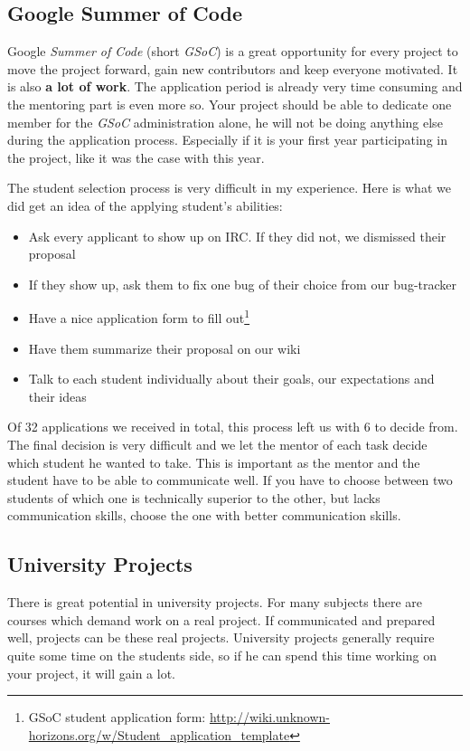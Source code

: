 \subsection{Google Summer of Code}
Google \textit{Summer of Code} (short \textit{GSoC}) is a great opportunity for every \OS{} project to move the project
forward, gain new contributors and keep everyone motivated. It is also \textbf{a lot of work}. The application period is
already very time consuming and the mentoring part is even more so. Your project should be able to dedicate one member
for the \textit{GSoC} administration alone, he will not be doing anything else during the application process. Especially
if it is your first year participating in the project, like it was the case with \UH{} this year.

The student selection process is very difficult in my experience. Here is what we did get an idea of the applying student's
abilities:
\begin{itemize}
    \item Ask every applicant to show up on IRC. If they did not, we dismissed their proposal
    \item If they show up, ask them to fix one bug of their choice from our bug-tracker
    \item Have a nice application form to fill out\footnote{\UH{} GSoC student application form:
        \url{http://wiki.unknown-horizons.org/w/Student_application_template}}
    \item Have them summarize their proposal on our wiki
    \item Talk to each student individually about their goals, our expectations and their ideas
\end{itemize}

Of 32 applications we received in total, this process left us with 6 to decide from. The final decision is very difficult
and we let the mentor of each task decide which student he wanted to take. This is important as the mentor and the
student have to be able to
communicate well. If you have to choose between two students of which one is technically superior to the other, but
lacks communication skills, choose the one with better communication skills.

\subsection{University Projects}
There is great potential in university projects. For many subjects there are courses which demand work on a real
project. If communicated and prepared well, \OS{} projects can be these real projects. University projects generally
require quite some time on the students side, so if he can spend this time working on your project, it will gain a lot.

